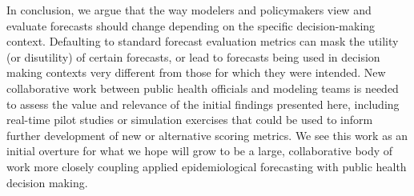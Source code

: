 \documentclass{article}\usepackage[]{graphicx}\usepackage[]{xcolor}
\begin{document}
In conclusion, we argue that the way modelers and policymakers view and evaluate forecasts should change depending on the specific decision-making context.
Defaulting to standard forecast evaluation metrics can mask the utility (or disutility) of certain forecasts, or lead to forecasts being used in decision making contexts very different from those for which they were intended.
New collaborative work between public health officials and modeling teams is needed to assess the value and relevance of the initial findings presented here, including real-time pilot studies or simulation exercises that could be used to inform further development of new or alternative scoring metrics.
We see this work as an initial overture for what we hope will grow to be a large, collaborative body of work more closely coupling applied epidemiological forecasting with public health decision making.


\end{document}
